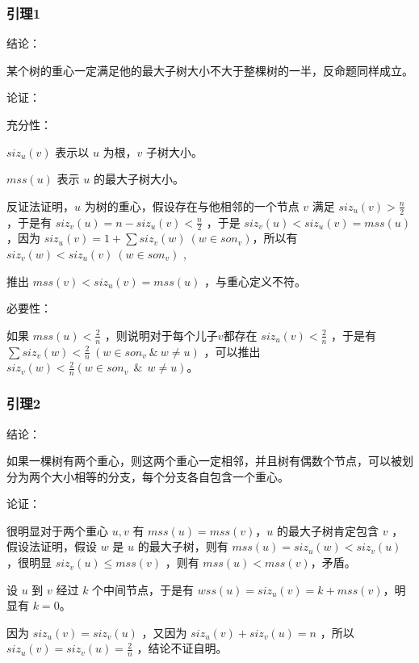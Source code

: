 \documentclass[UTF8]{ctexbeamer}
\begin{document}
        \begin{frame}
            \frametitle{引理1}
            结论：

            某个树的重心一定满足他的最大子树大小不大于整棵树的一半，反命题同样成立。


        \end{frame}
        
        \begin{frame}
            论证：

            充分性：

            $siz_u(v)$ 表示以 $u$ 为根，$v$ 子树大小。

            $mss(u)$ 表示 $u$ 的最大子树大小。

            反证法证明，$u$ 为树的重心，假设存在与他相邻的一个节点 $v$ 满足 $siz_u(v)>\frac n 2$ ，于是有 $siz_v(u)=n-siz_u(v)< \frac n 2 $ ，于是 $siz_v(u) <siz_u(v) =mss(u)$ ，因为 $siz_u(v)=1+\sum siz_v(w) ~(w\in son_v)$，所以有 $siz_v(w)<siz_u(v) ~ (w\in son_v)$ ,

            推出 $mss(v)<siz_u(v)=mss(u)$ ，与重心定义不符。

            必要性：

            如果 $mss(u) < \frac 2 n$ ，则说明对于每个儿子$v$都存在 $siz_u(v) < \frac 2 n$ ，于是有 $\sum siz_v(w) < \frac 2 n ~(w \in son_v ~\&~ w \neq u )$ ，可以推出$siz_v(w) < \frac 2 n (w \in son_v ~~\&~~ w \neq u)$。
        \end{frame}

        \begin{frame}
            \frametitle{引理2}
            结论：

            如果一棵树有两个重心，则这两个重心一定相邻，并且树有偶数个节点，可以被划分为两个大小相等的分支，每个分支各自包含一个重心。

            \hspace*{\fill}

            论证：

            很明显对于两个重心 $u,v$ 有 $mss(u)=mss(v)$，$u$ 的最大子树肯定包含 $v$ ，假设法证明，假设 $w$ 是 $u$ 的最大子树，则有 $mss(u)=siz_u(w)<siz_v(u)$ ，很明显 $siz_v(u) \leq mss(v) $ ，则有 $mss(u)<mss(v)$，矛盾。

            设 $u$ 到 $v$ 经过 $k$ 个中间节点，于是有 $wss(u)=siz_u(v)=k+mss(v)$，明显有 $k=0$。

            因为 $siz_u(v)=siz_v(u)$ ，又因为 $siz_u(v)+siz_v(u)=n$ ，所以 $siz_u(v)=siz_v(u)=\frac 2 n $ ，结论不证自明。
        \end{frame}
\end{document}
